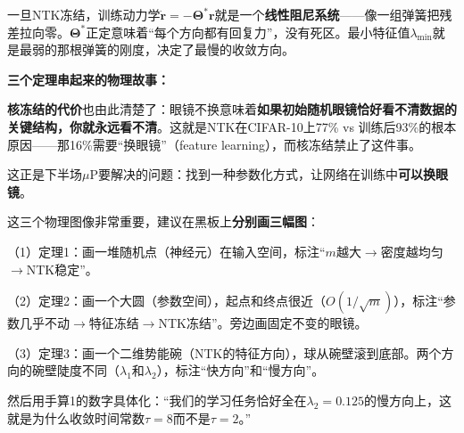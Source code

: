 \documentclass[11pt,a4paper]{article}
\newcommand{\bTheta}{\boldsymbol{\Theta}}
\newcommand{\br}{\mathbf{r}}
\begin{document}
\begin{keyinsight}[——定理3：全局收敛 = 线性弹簧系统]

一旦NTK冻结，训练动力学$\dot{\br}=-\bTheta^*\br$就是一个\textbf{线性阻尼系统}——像一组弹簧把残差拉向零。$\bTheta^*$正定意味着``每个方向都有回复力''，没有死区。最小特征值$\lambda_{\min}$就是最弱的那根弹簧的刚度，决定了最慢的收敛方向。

\textbf{三个定理串起来的物理故事：}

\medskip
\begin{center}
\end{center}
\medskip

\textbf{核冻结的代价}也由此清楚了：眼镜不换意味着\textbf{如果初始随机眼镜恰好看不清数据的关键结构，你就永远看不清}。这就是NTK在CIFAR-10上77\% vs 训练后93\%的根本原因——那16\%需要``换眼镜''（feature learning），而核冻结禁止了这件事。

这正是下半场$\mu$P要解决的问题：找到一种参数化方式，让网络在训练中\textbf{可以换眼镜}。
\end{keyinsight}

\begin{teachingtip}
这三个物理图像非常重要，建议在黑板上\textbf{分别画三幅图}：

（1）定理1：画一堆随机点（神经元）在输入空间，标注``$m$越大$\to$密度越均匀$\to$NTK稳定''。

（2）定理2：画一个大圆（参数空间），起点和终点很近（$O(1/\sqrt{m})$），标注``参数几乎不动$\to$特征冻结$\to$NTK冻结''。旁边画固定不变的眼镜。

（3）定理3：画一个二维势能碗（NTK的特征方向），球从碗壁滚到底部。两个方向的碗壁陡度不同（$\lambda_1$和$\lambda_2$），标注``快方向''和``慢方向''。

然后用手算1的数字具体化：``我们的学习任务恰好全在$\lambda_2=0.125$的慢方向上，这就是为什么收敛时间常数$\tau=8$而不是$\tau=2$。''
\end{teachingtip}
\end{document}
